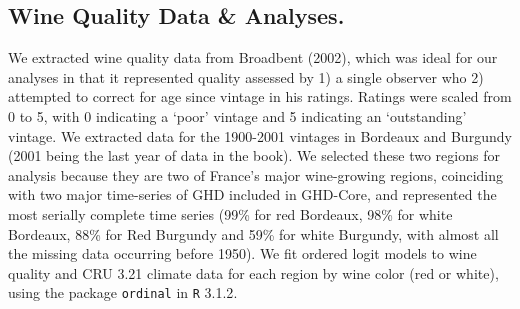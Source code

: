 \documentclass[final]{nature}
\begin{document}
\begin{methods}
\subsection{Wine Quality Data \& Analyses.}
\noindent We extracted wine quality data from Broadbent (2002)\cite{Broadbent2002}, which was ideal for our analyses in that it represented quality assessed by 1) a single observer who 2) attempted to correct for age since vintage in his ratings. Ratings were scaled from 0 to 5, with 0 indicating a `poor' vintage and 5 indicating an `outstanding' vintage. We extracted data for the 1900-2001 vintages in Bordeaux and Burgundy (2001 being the last year of data in the book). We selected these two regions for analysis because they are two of France's major wine-growing regions, coinciding with two major time-series of GHD included in GHD-Core, and represented the most serially complete time series (99\% for red Bordeaux, 98\% for white Bordeaux, 88\% for Red Burgundy and 59\% for white Burgundy, with almost all the missing data occurring before 1950). We fit ordered logit models to wine quality and CRU 3.21 climate data for each region by wine color (red or white), using the package \verb|ordinal| in \verb|R| 3.1.2\cite{Rcore2014}.

\end{methods}





\end{document}
